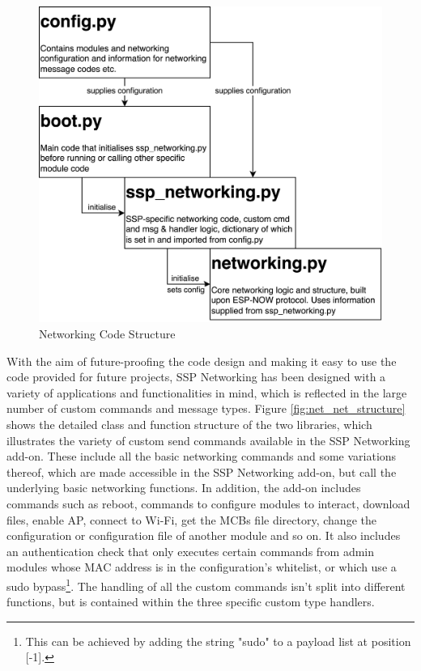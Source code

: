 \begin{figure}[H]
    \centering
    \includegraphics[width=.6\linewidth]{overleaf/images/code_structure.png}
    \vspace{\ftspace}
    \caption{Networking Code Structure}
    \label{fig:net_code_structure}
\end{figure}

With the aim of future-proofing the code design and making it easy to use the code provided for future projects, SSP Networking has been designed with a variety of applications and functionalities in mind, which is reflected in the large number of custom commands and message types. Figure \ref{fig:net_net_structure} shows the detailed class and function structure of the two libraries, which illustrates the variety of custom send commands available in the SSP Networking add-on. These include all the basic networking commands and some variations thereof, which are made accessible in the SSP Networking add-on, but call the underlying basic networking functions. In addition, the add-on includes commands such as reboot, commands to configure modules to interact, download files, enable AP, connect to Wi-Fi, get the MCBs file directory, change the configuration or configuration file of another module and so on. It also includes an authentication check that only executes certain commands from admin modules whose MAC address is in the configuration's whitelist, or which use a sudo bypass\footnote{This can be achieved by adding the string "sudo" to a payload list at position [-1].}. The handling of all the custom commands isn't split into different functions, but is contained within the three specific custom type handlers.

